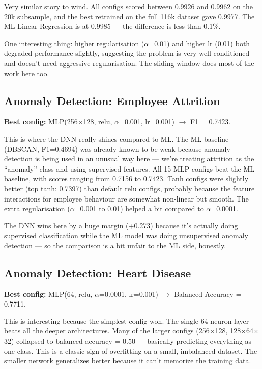\documentclass[11pt,a4paper]{article}
\begin{document}
Very similar story to wind. All configs scored between 0.9926 and 0.9962 on the 20k subsample, and the best retrained on the full 116k dataset gave 0.9977. The ML Linear Regression is at 0.9985 --- the difference is less than 0.1\%.

One interesting thing: higher regularisation ($\alpha$=0.01) and higher lr (0.01) both degraded performance slightly, suggesting the problem is very well-conditioned and doesn't need aggressive regularisation. The sliding window does most of the work here too.

\subsection{Anomaly Detection: Employee Attrition}

\textbf{Best config:} MLP(256$\times$128, relu, $\alpha$=0.001, lr=0.001) $\rightarrow$ F1 = 0.7423.

This is where the DNN really shines compared to ML. The ML baseline (DBSCAN, F1=0.4694) was already known to be weak because anomaly detection is being used in an unusual way here --- we're treating attrition as the ``anomaly'' class and using supervised features.
All 15 MLP configs beat the ML baseline, with scores ranging from 0.7156 to 0.7423. Tanh configs were slightly better (top tanh: 0.7397) than default relu configs, probably because the feature interactions for employee behaviour are somewhat non-linear but smooth. The extra regularisation ($\alpha$=0.001 to 0.01) helped a bit compared to $\alpha$=0.0001.

The DNN wins here by a huge margin (+0.273) because it's actually doing supervised classification while the ML model was doing unsupervised anomaly detection --- so the comparison is a bit unfair to the ML side, honestly.

\subsection{Anomaly Detection: Heart Disease}

\textbf{Best config:} MLP(64, relu, $\alpha$=0.0001, lr=0.001) $\rightarrow$ Balanced Accuracy = 0.7711.

This is interesting because the simplest config won. The single 64-neuron layer beats all the deeper architectures. Many of the larger configs (256$\times$128, 128$\times$64$\times$32) collapsed to balanced accuracy = 0.50 --- basically predicting everything as one class.
This is a classic sign of overfitting on a small, imbalanced dataset. The smaller network generalizes better because it can't memorize the training data.
\end{document}
